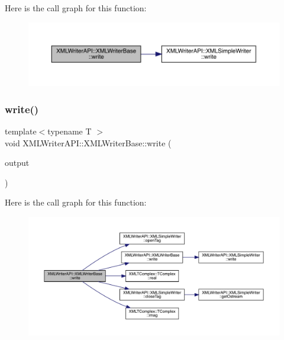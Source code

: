 Here is the call graph for this function\+:
\nopagebreak
\begin{figure}[H]
\begin{center}
\leavevmode
\includegraphics[width=350pt]{d5/df5/classXMLWriterAPI_1_1XMLWriterBase_ac9c7d2ed0127b4dd05b4b3c0225d9f34_cgraph}
\end{center}
\end{figure}
\mbox{\label{classXMLWriterAPI_1_1XMLWriterBase_a00b5edcaf39f8bdaf2aa5eed7118c8e7}} 
\subsubsection{\texorpdfstring{write()}{write()}\hspace{0.1cm}{\footnotesize\ttfamily [31/39]}}
{\footnotesize\ttfamily template$<$typename T $>$ \\
void X\+M\+L\+Writer\+A\+P\+I\+::\+X\+M\+L\+Writer\+Base\+::write (\begin{DoxyParamCaption}\item[{\mbox{\hyperlink{classXMLTComplex_1_1TComplex}{T\+Complex}}$<$ T $>$ \&}]{output }\end{DoxyParamCaption})\hspace{0.3cm}{\ttfamily [inline]}}

Here is the call graph for this function\+:
\nopagebreak
\begin{figure}[H]
\begin{center}
\leavevmode
\includegraphics[width=350pt]{d5/df5/classXMLWriterAPI_1_1XMLWriterBase_a00b5edcaf39f8bdaf2aa5eed7118c8e7_cgraph}
\end{center}
\end{figure}
\mbox{\label{classXMLWriterAPI_1_1XMLWriterBase_a00b5edcaf39f8bdaf2aa5eed7118c8e7}} 
